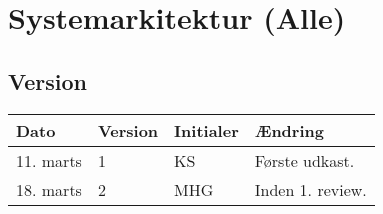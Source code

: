\chapter{Systemarkitektur (Alle)}

\section{Version}
\begin{table}[h]
	\centering
	\begin{tabularx}{\textwidth - 2cm}{|l|l|l|X|}
	\hline
	Dato	& Version	& Initialer & Ændring	\\ \hline
	11. marts & 1 & KS & Første udkast. \\ \hline
	18. marts & 2 & MHG & Inden 1. review. \\\hline
	\end{tabularx}
\end{table}


